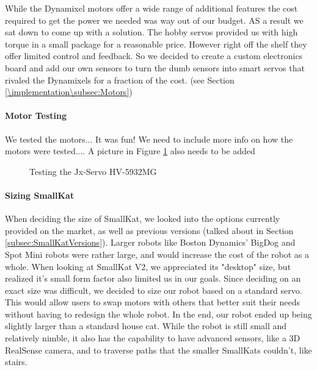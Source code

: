                 While the Dynamixel motors offer a wide range of additional features the cost required to get the power we needed was way out of our budget. AS a result we sat down to come up with a  solution. The hobby servos provided us with high torque in a small package for a reasonable price. However right off the shelf they offer limited control and feedback. So we decided to create a custom electronics board and add our own sensors to turn the dumb sensors into smart servos that rivaled the Dynamixels for a fraction of the cost. (see Section \ref{\implementation\subsec:Motors})
                
            \paragraph{Motor Testing}
                We tested the motors... It was fun!
                We need to include more info on how the motors were tested.... A picture in Figure \ref{fig:MotorTesting} also needs to be added

                \begin{figure}[H]
                    \centering
                    
                    \caption{Testing the Jx-Servo HV-5932MG}
                    \label{fig:MotorTesting}
                \end{figure}

            \paragraph{Sizing SmallKat}
                When deciding the size of SmallKat, we looked into the options currently provided on the market, as well as previous versions (talked about in Section \ref{subsec:SmallKatVersions}). Larger robots like Boston Dynamics' BigDog and Spot Mini robots were rather large, and would increase the cost of the robot as a whole. When looking at SmallKat V2, we appreciated its "desktop" size, but realized it's small form factor also limited us in our goals. Since deciding on an exact size was difficult, we decided to size our robot based on a standard servo. This would allow users to swap motors with others that better suit their needs without having to redesign the whole robot. In the end, our robot ended up being slightly larger than a standard house cat. While the robot is still small and relatively nimble, it also has the capability to have advanced sensors, like a 3D RealSense camera, and to traverse paths that the smaller SmallKats couldn't, like stairs.

